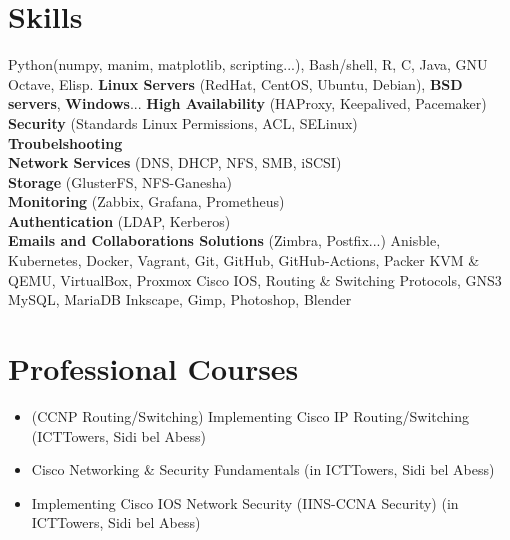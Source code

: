 \documentclass{cv}
\begin{document}
\section{Skills}
    {\textnormal{Python(numpy, manim, matplotlib, scripting...),
    Bash/shell,
    R, C, Java, GNU Octave, Elisp.}}
	{}
	{}
    {\textbf{Linux Servers} \textnormal{(RedHat, CentOS, Ubuntu, Debian)}, 
    \textbf{BSD servers}, 
    \textbf{Windows}...}
	{}
	{}
      {\textbf{High Availability} \textnormal{(HAProxy, Keepalived, Pacemaker)}\\
      \textbf{Security} \textnormal{(Standards Linux Permissions, ACL, SELinux)}\\
      \textbf{Troubelshooting}\\
      \textbf{Network Services} \textnormal{(DNS, DHCP, NFS, SMB, iSCSI)}\\
      \textbf{Storage} \textnormal{(GlusterFS, NFS-Ganesha)}\\ 
      \textbf{Monitoring} \textnormal{(Zabbix, Grafana, Prometheus)}\\ 
      \textbf{Authentication} \textnormal{(LDAP, Kerberos)}\\
      \textbf{Emails and Collaborations Solutions} \textnormal{(Zimbra, Postfix...)}}
	{}
	{}
	{Anisble, Kubernetes, Docker, Vagrant, Git, GitHub, GitHub-Actions, Packer}
	{}
	{}
    {KVM \& QEMU, VirtualBox, Proxmox}
	{}
	{}
    {Cisco IOS, Routing \& Switching Protocols, GNS3}
	{}
	{}
	{MySQL, MariaDB}
	{}
	{}
	{Inkscape, Gimp, Photoshop, Blender}
	{}

\section{Professional Courses}
\begin{itemize}
  \item (CCNP Routing/Switching) Implementing Cisco IP Routing/Switching  (ICTTowers, Sidi bel Abess)
  \item Cisco Networking \& Security Fundamentals (in ICTTowers, Sidi bel Abess)
  \item Implementing Cisco IOS Network Security (IINS-CCNA Security) (in ICTTowers, Sidi bel Abess)
\end{itemize}
\end{document}
